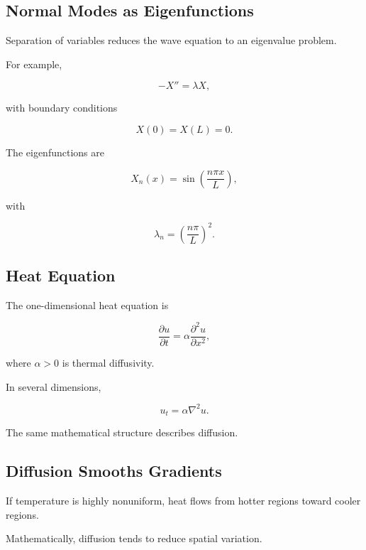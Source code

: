 \subsection{Normal Modes as Eigenfunctions}
\label{subsec:normal-modes-eigenfunctions}

Separation of variables reduces the wave equation to an eigenvalue problem.

For example,

\[
\boxed{
-X''=\lambda X,
}
\]

with boundary conditions

\[
X(0)=X(L)=0.
\]

The eigenfunctions are

\[
\boxed{
X_n(x)
=
\sin
\left(
\frac{n\pi x}{L}
\right),
}
\]

with

\[
\boxed{
\lambda_n
=
\left(
\frac{n\pi}{L}
\right)^2.
}
\]

\subsection{Heat Equation}
\label{subsec:physical-heat-equation}

The one-dimensional heat equation is

\[
\boxed{
\frac{\partial u}{\partial t}
=
\alpha
\frac{\partial^2u}{\partial x^2},
}
\]

where \(\alpha>0\) is thermal diffusivity.

In several dimensions,

\[
\boxed{
u_t
=
\alpha\nabla^2u.
}
\]

The same mathematical structure describes diffusion.

\subsection{Diffusion Smooths Gradients}
\label{subsec:diffusion-smoothing}

If temperature is highly nonuniform, heat flows from hotter regions toward
cooler regions.

Mathematically, diffusion tends to reduce spatial variation.

